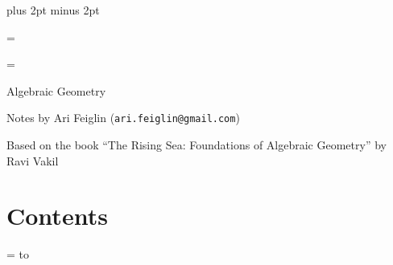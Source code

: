 


\parindent=0pt
\parskip=3pt plus 2pt minus 2pt

\footline={}


\headline={\pagedecor}

{\setboxshadow
\contentbox

    \centerline{Algebraic Geometry}
    \smallskip
    \centerline{Notes by Ari Feiglin ({\tt ari.feiglin@gmail.com})}
    \centerline{Based on the book {\rm``The Rising Sea: Foundations of Algebraic Geometry''} by Ravi Vakil}

\eppbox

\bigskip

\contentbox
    \section*{Contents}
    
    \tableofcontents
\eppbox

}

\vfill\break

\color{black}

\newif\ifpageodd
\pageoddtrue
\headline={%
    \hbox to \hsize{\color{black}%
        \ifpageodd\hfil{\it\currsubsection\quad\bf\folio}\global\pageoddfalse%
        \else{\bf\folio\quad\it\currsubsection}\hfil\global\pageoddtrue\fi%
    }%
}




\bye

